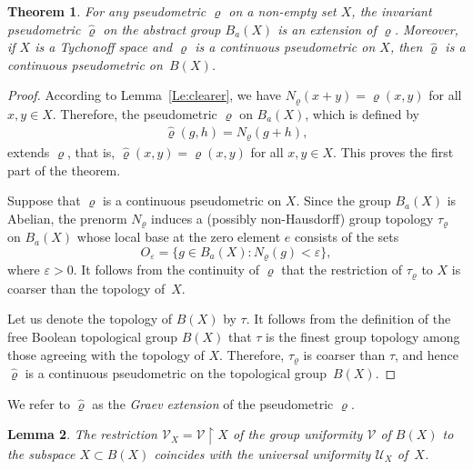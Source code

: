 \documentclass[a4paper,12pt]{amsart}
\def\sub{\subset}
\def\res{\restriction}
\let\mathcal\mathscr
\newtheorem{theorem}{Theorem}[section]
\newtheorem{lemma}[theorem]{Lemma}
\theoremstyle{definition}
\begin{document}
\begin{theorem}\label{Th_Gra}
For any pseudometric $\varrho$ on a non-empty set $X$, 
the invariant pseudometric $\widehat\varrho$ on the abstract group $B_a(X)$ is 
an extension of $\varrho$. Moreover, if $X$ is a Tychonoff space and $\varrho$ 
is a continuous pseudometric on $X$, then $\widehat{\varrho}$ is a continuous 
pseudometric on~$B(X)$. 
\end{theorem}

\begin{proof}
According to Lemma~\ref{Le:clearer}, we have $N_\varrho(x+y)=\varrho(x,y)$
for all $x,y\in X$. Therefore, the pseudometric 
$\widehat{\varrho}$ on $B_a(X)$, which is defined by
\begin{eqnarray*}
\widehat{\varrho}(g,h) = N_\varrho(g+h),  
\end{eqnarray*}
extends $\varrho$, that is, $\widehat{\varrho}(x,y)
=\varrho(x,y)$ for all $x,y\in X$. This proves
the first part of the theorem. 

Suppose that $\varrho$ is a continuous pseudometric on $X$.
Since the group $B_a(X)$ is Abelian, the prenorm $N_\varrho$
induces a (possibly non-Hausdorff) group topology $\tau_\varrho$  on $B_a(X)$ 
whose local base at the zero element $e$ consists of the sets 
$$ 
O_\varepsilon = \{g\in B_a(X): N_\varrho(g)<\varepsilon\},
$$
where $\varepsilon>0$. It follows from the continuity of $\varrho$ that the 
restriction of $\tau_\varrho$ to $X$ is coarser than the topology of~$X$. 

Let us denote the topology of $B(X)$ by $\tau$. It follows from the definition 
of the free Boolean topological group $B(X)$ that $\tau$ is the finest 
group topology among those agreeing with the topology of $X$. Therefore, 
$\tau_\varrho$ is coarser than $\tau$, and hence $\widehat{\varrho}$ is a 
continuous pseudometric on the topological group~$B(X)$. 
\end{proof}

We refer to $\widehat \varrho$ as the \emph{Graev extension} of the 
pseudometric $\varrho$. 

\begin{lemma}\label{L_unif}
The restriction $\mathcal{V}_X=\mathcal{V}\res X$ of the 
group uniformity $\mathcal{V}$ of $B(X)$ to the subspace 
$X\sub B(X)$ coincides with the universal uniformity $\mathcal{U}_X$ 
of~$X$.
\end{lemma}
\end{document}
